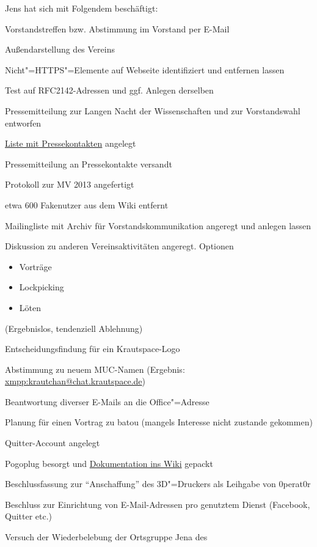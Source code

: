 \documentclass[ngerman]{scrartcl}
\begin{document}
Jens hat sich mit Folgendem beschäftigt:

\begin{compactitem}
\item Vorstandstreffen bzw. Abstimmung im Vorstand per E-Mail
\item Außendarstellung des Vereins
\item Nicht"=HTTPS"=Elemente auf Webseite identifiziert und entfernen
  lassen
\item Test auf RFC2142-Adressen und ggf. Anlegen derselben
\item Pressemitteilung zur Langen Nacht der Wissenschaften und zur
  Vorstandswahl entworfen
\item \href{https://www.krautspace.de/presse#pressekontakte}{Liste mit
    Pressekontakten} angelegt
\item Pressemitteilung an Pressekontakte versandt
\item Protokoll zur MV 2013 angefertigt
\item etwa 600 Fakenutzer aus dem Wiki entfernt
\item Mailingliste mit Archiv für Vorstandskommunikation angeregt und
  anlegen lassen
\item Diskussion zu anderen Vereinsaktivitäten angeregt. Optionen
  \begin{itemize}
  \item Vorträge
  \item Lockpicking
  \item Löten
  \end{itemize} (Ergebnislos, tendenziell Ablehnung)
\item Entscheidungsfindung für ein Krautspace-Logo
\item Abstimmung zu neuem MUC-Namen (Ergebnis:
  \url{xmpp:krautchan@chat.krautspace.de})
\item Beantwortung diverser E-Mails an die Office"=Adresse
\item Planung für einen Vortrag zu batou (mangels Interesse nicht
  zustande gekommen)
\item Quitter-Account angelegt
\item Pogoplug besorgt und
  \href{https://www.krautspace.de/hswiki:projekte:pogoplug}{Dokumentation
    ins Wiki} gepackt
\item Beschlussfassung zur "`Anschaffung"' des 3D"=Druckers als
  Leihgabe von 0perat0r
\item Beschluss zur Einrichtung von E-Mail-Adressen pro genutztem
  Dienst (Facebook, Quitter etc.)
\item Versuch der Wiederbelebung der Ortsgruppe Jena des

\end{compactitem}
\end{document}
